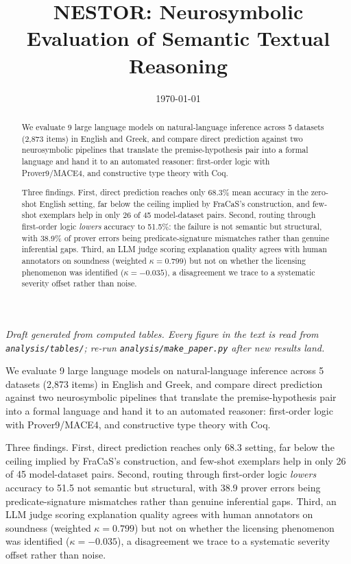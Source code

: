 \documentclass[11pt]{article}
\title{NESTOR: Neurosymbolic Evaluation of Semantic Textual Reasoning}
\author{}
\date{\today}
\begin{document}
\maketitle
\begin{abstract}
We evaluate 9 large language models on natural-language
inference across 5 datasets (2,873 items) in
English and Greek, and compare direct prediction against two
neurosymbolic pipelines that translate the premise-hypothesis pair into a
formal language and hand it to an automated reasoner: first-order logic
with Prover9/MACE4, and constructive type theory with Coq.

Three findings. First, direct prediction reaches only
68.3\% mean accuracy in the zero-shot English
setting, far below the ceiling implied by FraCaS's construction, and
few-shot exemplars help in only 26 of
45 model-dataset pairs. Second, routing through
first-order logic \emph{lowers} accuracy to 51.5\%: the failure is
not semantic but structural, with 38.9\% of
prover errors being predicate-signature mismatches rather than genuine
inferential gaps. Third, an LLM judge scoring explanation quality agrees
with human annotators on soundness (weighted
$\kappa=0.799$) but not on whether the
licensing phenomenon was identified
($\kappa=-0.035$), a disagreement we
trace to a systematic severity offset rather than noise.
\end{abstract}



\emph{Draft generated from computed tables. Every figure in the text is read from \texttt{analysis/tables/}; re-run \texttt{analysis/make_paper.py} after new results land.}




We evaluate 9 large language models on natural-language
inference across 5 datasets (2,873 items) in
English and Greek, and compare direct prediction against two
neurosymbolic pipelines that translate the premise-hypothesis pair into a
formal language and hand it to an automated reasoner: first-order logic
with Prover9/MACE4, and constructive type theory with Coq.

Three findings. First, direct prediction reaches only
68.3%
setting, far below the ceiling implied by FraCaS's construction, and
few-shot exemplars help in only 26 of
45 model-dataset pairs. Second, routing through
first-order logic \emph{lowers} accuracy to 51.5%
not semantic but structural, with 38.9%
prover errors being predicate-signature mismatches rather than genuine
inferential gaps. Third, an LLM judge scoring explanation quality agrees
with human annotators on soundness (weighted
$\kappa=0.799$) but not on whether the
licensing phenomenon was identified
($\kappa=-0.035$), a disagreement we
trace to a systematic severity offset rather than noise.
\end{document}
